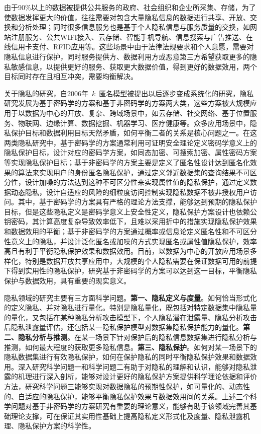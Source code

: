 由于90\%以上的数据被提供公共服务的政府、社会组织和企业所采集、存储，为了使数据发挥更大的价值，往往需要对包含大量隐私信息的数据进行共享、开放、交换和分析处理；同时很多信息服务也是基于个人隐私信息与服务质量的交换，如网站注册服务、公共WIFI接入、云存储、智能手机导航、信息搜索与广告推送、在线信用卡支付、RFID应用等。这些场景中由于法律法规要求和个人意愿，需要对隐私信息进行保护，同时服务提供方、数据利用方或恶意第三方希望获取更多的隐私敏感信息，以提供更好的服务、获取更大数据价值，得到更好的数据效用，两个目标同时存在且相互冲突，需要均衡解决。

关于隐私的研究，自2006年~$k$~匿名模型\cite{sweeney2002k}被提出以后逐步变成系统化的研究，隐私研究发展为基于密码学的方案\cite{nabeel2014privacy,huang2015review}和基于非密码学的方案\cite{sweeney2002k,machanavajjhala2007l,li2007t,dwork2006differential,zhang2018privacy}两大类，这些方案被大规模应用于以数据为中心的开放、复杂、跨域场景中，如云存储、社交网络、基于位置服务、物联网、边缘计算、数据挖掘、机器学习、医疗健康等。众多应用场景中，隐私保护目标和数据利用目标天然矛盾，如何平衡二者的关系是核心问题之一。在这两类隐私研究中，基于密码学的方案通常利用可证明安全理论定义密码学意义上的隐私保护目标，设计对应的密码学方案，如同态加密、可搜索加密、属性密码方案等实现隐私保护目标\cite{nabeel2014privacy,huang2015review}；基于非密码学的方案主要是定义了匿名性设计达到匿名化效果的算法来实现用户的身份匿名隐私保护\cite{sweeney2002k,machanavajjhala2007l,li2007t}，通过定义邻近数据集的查询结果不可区分性，设计加噪的方法达到这种不可区分性来实现属性值的隐私保护\cite{dwork2006differential}，通过定义数据动态隐私，设计自适应的风险的细粒度访问控制实现隐私数据不被非授权用户访问\cite{zhang2018privacy}。其中，基于密码学的方案具有严格的理论方法支撑，能够达到预期的隐私保护目标，但是这些隐私定义是密码学意义上安全性定义，隐私保护方案设计也依赖公钥密码，其计算高度复杂导致效率低下，且难以采用折中的措施实现隐私保护效果和数据效用的平衡；基于非密码学的方案通过概率或信息论定义匿名性和不可区分性意义上的隐私，并设计泛化匿名或加噪的方式实现匿名或属性值隐私保护，效率高且有利于平衡隐私保护效果和数据效用。目前，以数据为中心的开放应用场景多样化，特别是数据开放共享应用中，大规模的个人隐私需要在保证数据可用的前提下得到实用性的隐私保护，研究基于非密码学的方案可以达到这一目标，平衡隐私保护与数据效用，具有重要的现实意义。

隐私领域的研究主要有三方面科学问题。\textbf{第一、隐私定义与度量}。如何恰当形式化的定义隐私、并对隐私进行量化。特别是隐私量化，既包括对特定数据集中隐私量的量化，又包括在某种隐私分析攻击模型下，个人隐私潜在泄露量、隐私分析攻击后隐私泄露量评估，还包括某一隐私保护模型对数据集隐私保护能力的量化。\textbf{第二、隐私分析与推测}。在某一场景下针对保护后的隐私信息数据集进行隐私分析与推测，如何最大程度的获取更多隐私信息。\textbf{第三、隐私保护}。如何对某一场景下的隐私数据集进行有效隐私保护，如何在保护隐私的同时平衡隐私保护效果和数据效用。深入研究科学问题一和科学问题二有助于对隐私的理解和认识，能够对隐私泄露的机理进行深入剖析，能够对设计更好的隐私保护方案提供科学理论依据和评价方法，研究科学问题三能够实现对数据隐私的预期性保护，如可量化的、动态性的、自适应的隐私保护，能够平衡隐私保护效果与数据效用间的关系。上述三个科学问题对基于非密码学的方案研究有重要的理论意义，能够有助于该领域完善其基础理论支撑，可在保证其实用性基础上提高隐私定义形式化及度量、隐私泄露机理、隐私保护方案的科学性。


